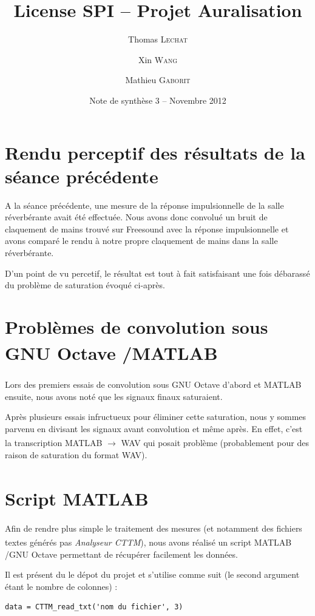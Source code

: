 \documentclass[12pt]{article}
\title{License SPI -- Projet Auralisation}
\author{Thomas \textsc{Lechat} \and Xin \textsc{Wang} \and Mathieu \textsc{Gaborit}}
\date{Note de synthèse 3 -- Novembre 2012}
\newcommand{\Octave}{GNU Octave }
\newcommand{\Matlab}{MATLAB\textsuperscript{\textregistered} }
\begin{document}
 \maketitle

\tableofcontents

\section{Rendu perceptif des résultats de la séance précédente} %

A la séance précédente, une mesure de la réponse impulsionnelle de la salle réverbérante avait été effectuée. Nous avons donc convolué un bruit de claquement de mains trouvé sur Freesound avec la réponse impulsionnelle et avons comparé le rendu à notre propre claquement de mains dans la salle réverbérante. 

D'un point de vu percetif, le résultat est tout à fait satisfaisant une fois débarassé du problème de saturation évoqué ci-après.

\section{Problèmes de convolution sous \Octave/\Matlab} %

Lors des premiers essais de convolution sous \Octave d'abord et \Matlab ensuite, nous avons noté que les signaux finaux saturaient.

Après plusieurs essais infructueux pour éliminer cette saturation, nous y sommes parvenu en divisant les signaux avant convolution et même après. En effet, c'est la transcription \Matlab $\rightarrow$ WAV qui posait problème (probablement pour des raison de saturation du format WAV).

\section{Script \Matlab} %

Afin de rendre plus simple le traitement des mesures (et notamment des fichiers textes générés pas \textit{Analyseur CTTM}), nous avons réalisé un script \Matlab/\Octave permettant de récupérer facilement les données.

Il est présent du le dépot du projet et s'utilise comme suit (le second argument étant le nombre de colonnes) :

\begin{verbatim}
data = CTTM_read_txt('nom du fichier', 3)
\end{verbatim}
\end{document}
